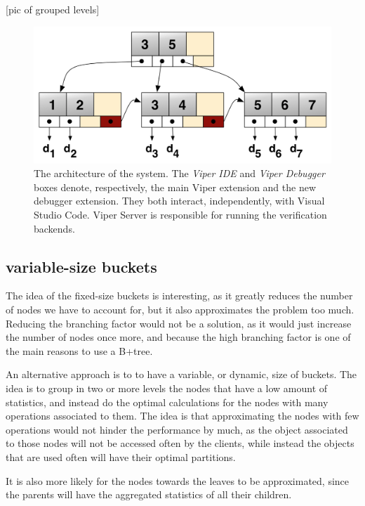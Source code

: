 [pic of grouped levels]
\begin{figure}[htb]
  \centering
  \includegraphics[width=\textwidth,height=\textheight,keepaspectratio]{img/b+tree.png}
  \caption[The architecture of the system]{ The architecture of the system. The
    \textit{Viper IDE} and \textit{Viper Debugger} boxes denote, respectively,
    the main Viper extension and the new debugger extension. They both interact,
    independently, with Visual Studio Code. Viper Server is responsible for
    running the verification backends.}
  \label{fig:b+tree}
\end{figure}

\subsection{variable-size buckets}\label{sec:variable-size buckets}
The idea of the fixed-size buckets is interesting, as it greatly reduces the number of nodes we have to account for, but it also approximates the problem too much. Reducing the branching factor would not be a solution, as it would just increase the number of nodes once more, and because the high branching factor is one of the main reasons to use a B+tree. 

An alternative approach is to to have a variable, or dynamic, size of buckets. The idea is to group in two or more levels the nodes that have a low amount of statistics, and instead do the optimal calculations for the nodes with many operations associated to them. The idea is that approximating the nodes with few operations would not hinder the performance by much, as the object associated to those nodes will not be accessed often by the clients, while instead the objects that are used often will have their optimal partitions.

It is also more likely for the nodes towards the leaves to be approximated, since the parents will have the aggregated statistics of all their children.

